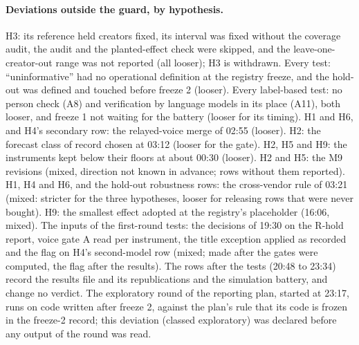 \paragraph{Deviations outside the guard, by hypothesis.} H3: its reference held creators fixed, its interval was fixed
without the coverage audit, the audit and the planted-effect check were skipped, and the leave-one-creator-out range
was not reported (all looser); H3 is withdrawn. Every test: ``uninformative'' had no operational definition at the
registry freeze, and the hold-out was defined and touched before freeze 2 (looser). Every label-based test: no person
check (A8) and verification by language models in its place (A11), both looser, and freeze 1 not waiting for the
battery (looser for its timing). H1 and H6, and H4's secondary row: the relayed-voice merge of 02:55 (looser). H2: the
forecast class of record chosen at 03:12 (looser for the gate). H2, H5 and H9: the instruments kept below their floors
at about 00:30 (looser). H2 and H5: the M9 revisions (mixed, direction not known in advance; rows without them
reported). H1, H4 and H6, and the hold-out robustness rows: the cross-vendor rule of 03:21 (mixed: stricter for the three
hypotheses, looser for releasing rows that were never bought). H9: the smallest effect adopted at the registry's
placeholder (16:06, mixed). The inputs of the first-round tests: the decisions of 19:30 on the R-hold report, voice gate
A read per instrument, the title exception applied as recorded and the flag on H4's second-model row (mixed; made after
the gates were computed, the flag after the results). The rows after the tests (20:48 to 23:34) record the results file
and its republications and the simulation battery, and change no verdict. The exploratory round of the reporting plan,
started at 23:17, runs on code written after freeze 2, against the plan's rule that its code is frozen in the freeze-2
record; this deviation (classed exploratory) was declared before any output of the round was read.

